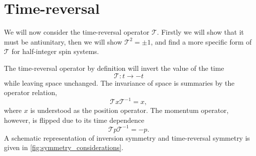 \section{Time-reversal}
We will now consider the time-reversal operator $\mathcal{T} $.
Firstly we will show that it must be antiunitary, then we will show $\mathcal{T}^2 = \pm 1$, and find a more specific form of $\mathcal{T}$ for half-integer spin systems.


The time-reversal operator by definition will invert the value of the time
$$
\mathcal{T}: t \rightarrow -t
$$
while leaving space unchanged.
The invariance of space is summaries by the operator relation,
\begin{equation}
  \label{eq:TRdef}
  \mathcal{T} x \mathcal{T}^{-1} = x,
\end{equation}
where $x$ is understood as the position operator.
The momentum operator, however, is flipped due to its time dependence
\begin{equation}
  \label{eq:Pdef}
  \mathcal{T} p \mathcal{T}^{-1} = - p.
\end{equation}
A schematic representation of inversion symmetry and time-reversal symmetry is given in \cref{fig:symmetry_considerations}.


